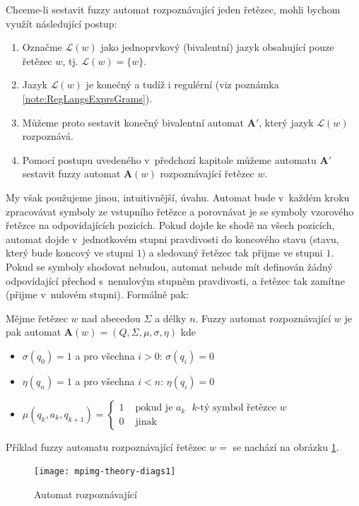 Chceme-li sestavit fuzzy automat rozpoznávající jeden řetězec, mohli bychom využít následující postup:
\begin{enumerate} 
 \item Označme $\mathcal{L}(w)$ jako jednoprvkový (bivalentní) jazyk obsahující pouze řetězec $w$, tj. $\mathcal{L}(w) = \{ w \}$.
 \item Jazyk $\mathcal{L}(w)$ je konečný a tudíž i regulérní (viz poznámka \ref{note:RegLangsExprsGrams}).
 \item Můžeme proto sestavit konečný bivalentní automat $\mathbf{A}'$, který jazyk $\mathcal{L}(w)$ rozpoznává.
 \item Pomocí postupu uvedeného v~předchozí kapitole můžeme automatu $\mathbf{A}'$ sestavit fuzzy automat $\mathbf{A}(w)$ rozpoznávající řetězec $w$.
\end{enumerate}

My však použujeme jinou, intuitivnější, úvahu. Automat bude v~každém kroku zpracovávat symboly ze vstupního řetězce a porovnávat je se symboly vzorového řetězce na odpovídajících pozicích. Pokud dojde ke shodě na všech pozicích, automat dojde v~jednotkovém stupni pravdivosti do koncového stavu (stavu, který bude koncový ve stupni $1$) a sledovaný řetězec tak přijme ve stupni $1$. Pokud se symboly shodovat nebudou, automat nebude mít definován žádný odpovídající přechod s~nenulovým stupněm pravdivosti, a řetězec tak zamítne (přijme v~nulovém stupni). Formálně pak:

\begin{definition} \label{def-FuzzAutRozpOme}
  Mějme řetězec $w$ nad abecedou $\Sigma$ a délky $n$. Fuzzy automat rozpoznávající $w$ je pak automat $\mathbf{A}(w) = ( Q, \Sigma, \mu, \sigma, \eta )$ kde
  \begin{itemize}
   \item $\sigma(q_0) = 1$ a pro všechna $i > 0$: $\sigma(q_i) = 0$ 
   \item $\eta(q_n) = 1$ a pro všechna $i < n$: $\eta(q_i) = 0$ 
   \item $\mu(q_{k}, a_k, q_{k+1}) = 
      \begin{cases}
	1		& \text{ pokud je $a_k$ $k$-tý symbol řetězce $w$} \\
	0		& \text{ jinak}
      \end{cases}
      $
  \end{itemize}
\end{definition}

\begin{example}
 Příklad fuzzy automatu rozpoznávající řetězec $w = $  se nachází na obrázku \ref{diag-AutRozpHell}.   

  \begin{figure}
    \texttt{[image: mpimg-theory-diags1]}
    \caption{Automat rozpoznávající } \label{diag-AutRozpHell} 
  \end{figure}
\end{example}

